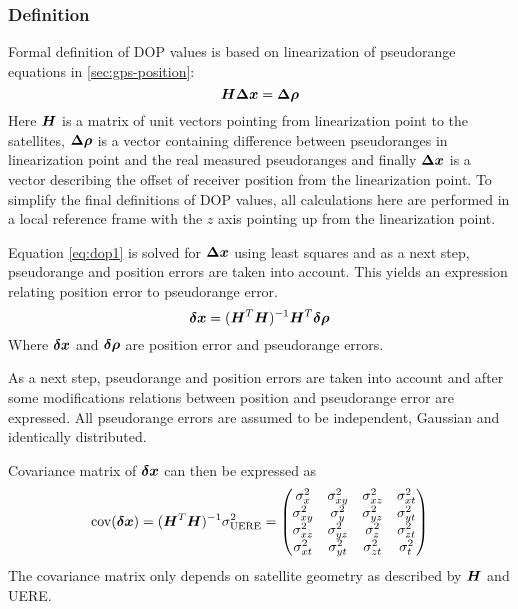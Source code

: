 \subsubsection{Definition}
Formal definition of DOP values is based on linearization of pseudorange equations
in \cref{sec:gps-position}:
\begin{equation}
	\label{eq:dop1}
	\bm{H}\bm{\Delta{}x} = \bm{\Delta{}\rho}
\end{equation}
Here \(\bm{H}\) is a matrix of unit vectors pointing from linearization point
to the satellites, \(\bm{\Delta{}\rho}\) is a vector containing difference between
pseudoranges in linearization point and the real measured pseudoranges and finally
\(\bm{\Delta{}x}\) is a vector describing the offset of receiver position from the
linearization point.
To simplify the final definitions of DOP values, all calculations here are performed
in a local reference frame with the \(z\) axis pointing up from the linearization point.

Equation \eqref{eq:dop1} is solved for \(\bm{\Delta{}x}\) using least squares and
as a next step, pseudorange and position errors are taken into account.
This yields an expression relating position error to pseudorange error.
\begin{equation}
	\bm{\delta{}x} = (\bm{H}^T \bm{H})^{-1} \bm{H}^T \bm{\delta{}\rho}
\end{equation}
Where \(\bm{\delta{}x}\) and \(\bm{\delta{}\rho}\) are position error and pseudorange errors.

As a next step, pseudorange and position errors are taken into account and after
some modifications relations between position and pseudorange error are expressed.
All pseudorange errors are assumed to be independent, Gaussian and identically distributed.

Covariance matrix of \(\bm{\delta{}x}\) can then be expressed as
\begin{equation}
	\operatorname{\mathrm{cov}}(\bm{\delta{}x}) =
		(\bm{H}^T \bm{H})^{-1} \sigma^2_{\mathrm{UERE}} =
		\begin{pmatrix}
			\sigma^2_{x}  & \sigma^2_{xy} & \sigma^2_{xz} & \sigma^2_{xt} \\
			\sigma^2_{xy} & \sigma^2_{y}  & \sigma^2_{yz} & \sigma^2_{yt} \\
			\sigma^2_{xz} & \sigma^2_{yz} & \sigma^2_{z}  & \sigma^2_{zt} \\
			\sigma^2_{xt} & \sigma^2_{yt} & \sigma^2_{zt} & \sigma^2_{t}
		\end{pmatrix}
\end{equation}
The covariance matrix only depends on satellite geometry as described by \(\bm{H}\) and UERE.

